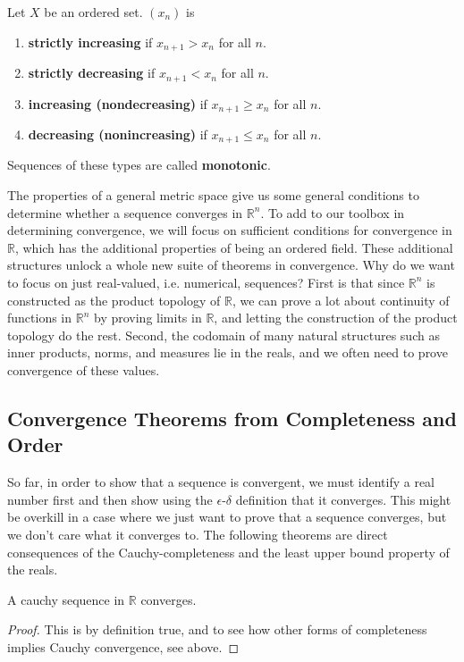   \begin{definition}
    Let $X$ be an ordered set. $(x_n)$ is 
    \begin{enumerate}
      \item \textbf{strictly increasing} if $x_{n+1} > x_n$ for all $n$.
      \item \textbf{strictly decreasing} if $x_{n+1} < x_n$ for all $n$.
      \item \textbf{increasing (nondecreasing)} if $x_{n+1} \geq x_n$ for all $n$.
      \item \textbf{decreasing (nonincreasing)} if $x_{n+1} \leq x_n$ for all $n$.
    \end{enumerate}
    Sequences of these types are called \textbf{monotonic}. 
  \end{definition}

  The properties of a general metric space give us some general conditions to determine whether a sequence converges in $\mathbb{R}^n$. To add to our toolbox in determining convergence, we will focus on sufficient conditions for convergence in $\mathbb{R}$, which has the additional properties of being an ordered field. These additional structures unlock a whole new suite of theorems in convergence. Why do we want to focus on just real-valued, i.e. numerical, sequences? First is that since $\mathbb{R}^n$ is constructed as the product topology of $\mathbb{R}$, we can prove a lot about continuity of functions in $\mathbb{R}^n$ by proving limits in $\mathbb{R}$, and letting the construction of the product topology do the rest. Second, the codomain of many natural structures such as inner products, norms, and measures lie in the reals, and we often need to prove convergence of these values.  

\subsection{Convergence Theorems from Completeness and Order}

  So far, in order to show that a sequence is convergent, we must identify a real number first and then show using the $\epsilon$-$\delta$ definition that it converges. This might be overkill in a case where we just want to prove that a sequence converges, but we don't care what it converges to. The following theorems are direct consequences of the Cauchy-completeness and the least upper bound property of the reals. 

  \begin{theorem}
    A cauchy sequence in $\mathbb{R}$ converges. 
  \end{theorem} 
  \begin{proof}
    This is by definition true, and to see how other forms of completeness implies Cauchy convergence, see above. 
  \end{proof}

